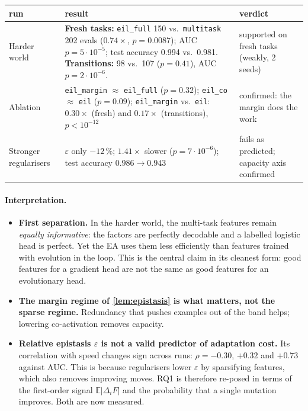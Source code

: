 \documentclass[11pt,a4paper]{article}
\theoremstyle{definition}
\theoremstyle{plain}
\theoremstyle{remark}
\newcommand{\E}{\mathbb{E}}
\begin{document}
\begin{center}
\small
\begin{tabularx}{\linewidth}{@{}L{2.3cm}Y L{2.4cm}@{}}
\toprule
run & result & verdict \\
\midrule
Harder world & \textbf{Fresh tasks:} \texttt{eil\_full} 150 vs.\ \texttt{multitask} 202 evals ($0.74\times$, $p=0.0087$); AUC $p=5\cdot10^{-5}$; test accuracy 0.994 vs.\ 0.981. \textbf{Transitions:} 98 vs.\ 107 ($p=0.41$), AUC $p=2\cdot10^{-6}$. & supported on fresh tasks (weakly, 2 seeds) \\
Ablation & \texttt{eil\_margin} $\approx$ \texttt{eil\_full} ($p=0.32$); \texttt{eil\_co} $\approx$ \texttt{eil} ($p=0.09$); \texttt{eil\_margin} vs.\ \texttt{eil}: $0.30\times$ (fresh) and $0.17\times$ (transitions), $p<10^{-12}$ & confirmed: the margin does the work \\
Stronger regularisers & $\varepsilon$ only $-12\,\%$; $1.41\times$ slower ($p=7\cdot10^{-6}$); test accuracy $0.986\to0.943$ & fails as predicted; capacity axis confirmed \\
\bottomrule
\end{tabularx}
\end{center}

\paragraph{Interpretation.}
\begin{itemize}
\item \textbf{First separation.} In the harder world, the multi-task features remain \emph{equally informative}: the factors are perfectly decodable and a labelled logistic head is perfect. Yet the EA uses them less efficiently than features trained with evolution in the loop. This is the central claim in its cleanest form: good features for a gradient head are not the same as good features for an evolutionary head.
\item \textbf{The margin regime of \cref{lem:epistasis} is what matters, not the sparse regime.} Redundancy that pushes examples out of the band helps; lowering co-activation removes capacity.
\item \textbf{Relative epistasis $\varepsilon$ is not a valid predictor of adaptation cost.} Its correlation with speed changes sign across runs: $\rho=-0.30$, $+0.32$ and $+0.73$ against AUC. This is because regularisers lower $\varepsilon$ by sparsifying features, which also removes improving moves. RQ1 is therefore re-posed in terms of the first-order signal $\E|\Delta_iF|$ and the probability that a single mutation improves. Both are now measured.
\end{itemize}
\end{document}
